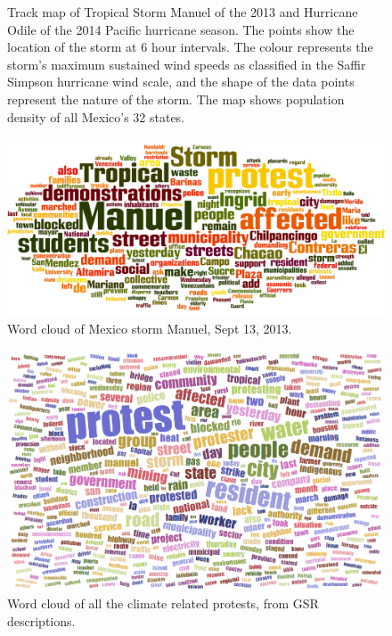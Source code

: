 \documentclass[9pt,twocolumn,twoside]{pnas-new}
\begin{document}
\begin{figure}[ht]
	\centering
	\caption{Track map of Tropical Storm Manuel of the 2013 and Hurricane Odile of the 2014 Pacific hurricane season. The points show the location of the storm at 6 hour intervals. The colour represents the storm's maximum sustained wind speeds as classified in the Saffir Simpson hurricane wind scale, and the shape of the data points represent the nature of the storm. The map shows population density of all Mexico's 32 states. }
\label{Mexico-track-map}
\end{figure}


\begin{figure}[ht]
\centerline
{\includegraphics[width=.3\textwidth]{figures/Mexico_Manuel_wordcloud}}
\caption{Word cloud of Mexico storm Manuel, Sept 13, 2013.}
\label{Manuel_word_cloud}
\end{figure}


\begin{figure}[ht]
\centerline
{\includegraphics[width=.35\textwidth]{figures/Climate_word_cloud}}
\caption{Word cloud of all the climate related protests, from GSR descriptions.}
\label{wordcloud}
\end{figure}
\end{document}
